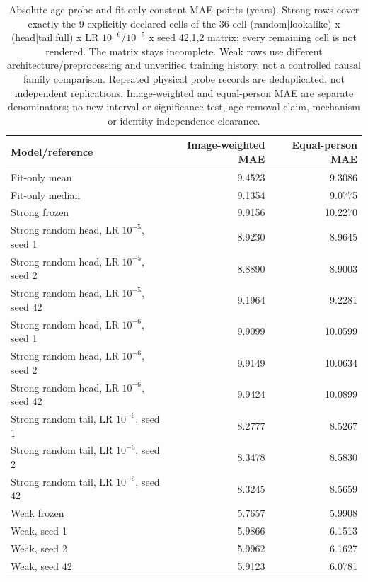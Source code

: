 \begin{table}[!t]
\caption{Absolute age-probe and fit-only constant MAE points (years). Strong rows cover exactly the 9 explicitly declared cells of the 36-cell (random|lookalike) x (head|tail|full) x LR $10^{-6}$/$10^{-5}$ x seed {42,1,2} matrix; every remaining cell is not rendered. The matrix stays incomplete. Weak rows use different architecture/preprocessing and unverified training history, not a controlled causal family comparison. Repeated physical probe records are deduplicated, not independent replications. Image-weighted and equal-person MAE are separate denominators; no new interval or significance test, age-removal claim, mechanism or identity-independence clearance.}
\label{tab:age-probe-absolute-points}
\centering\scriptsize
\begin{tabular}{@{}lrr@{}}
\toprule
Model/reference & Image-weighted MAE & Equal-person MAE \\
\midrule
Fit-only mean & 9.4523 & 9.3086 \\
Fit-only median & 9.1354 & 9.0775 \\
Strong frozen & 9.9156 & 10.2270 \\
Strong random head, LR $10^{-5}$, seed 1 & 8.9230 & 8.9645 \\
Strong random head, LR $10^{-5}$, seed 2 & 8.8890 & 8.9003 \\
Strong random head, LR $10^{-5}$, seed 42 & 9.1964 & 9.2281 \\
Strong random head, LR $10^{-6}$, seed 1 & 9.9099 & 10.0599 \\
Strong random head, LR $10^{-6}$, seed 2 & 9.9149 & 10.0634 \\
Strong random head, LR $10^{-6}$, seed 42 & 9.9424 & 10.0899 \\
Strong random tail, LR $10^{-6}$, seed 1 & 8.2777 & 8.5267 \\
Strong random tail, LR $10^{-6}$, seed 2 & 8.3478 & 8.5830 \\
Strong random tail, LR $10^{-6}$, seed 42 & 8.3245 & 8.5659 \\
Weak frozen & 5.7657 & 5.9908 \\
Weak, seed 1 & 5.9866 & 6.1513 \\
Weak, seed 2 & 5.9962 & 6.1627 \\
Weak, seed 42 & 5.9123 & 6.0781 \\
\bottomrule
\end{tabular}
\end{table}
